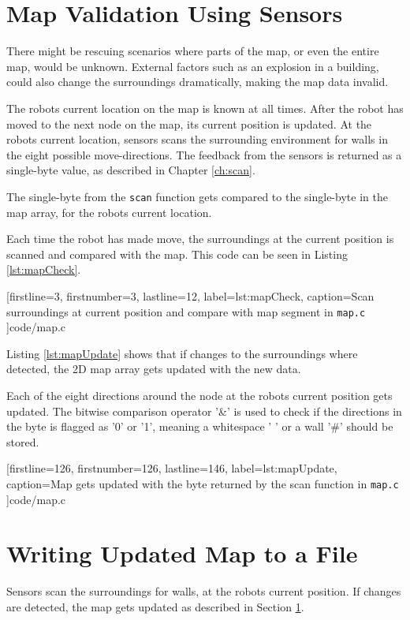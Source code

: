 \section{Map Validation Using Sensors}
\label{sec:map_check} %
There might be rescuing scenarios where parts of the map, or even the entire map, would be unknown.
External factors such as an explosion in a building, could also change the surroundings dramatically, making the map data invalid.
 
The robots current location on the map is known at all times. 
After the robot has moved to the next node on the map, its current position is updated.
At the robots current location, sensors scans the surrounding environment for walls in the eight possible move-directions.
The feedback from the sensors is returned as a single-byte value, as described in Chapter \ref{ch:scan}.

The single-byte from the {\tt scan} function gets compared to the single-byte in the map array, for the robots current location.


Each time the robot has made move, the surroundings at the current position is scanned and compared with the map.
This code can be seen in Listing \ref{lst:mapCheck}.
 

[firstline=3,			%
firstnumber=3,		%
lastline=12,			%
label=lst:mapCheck,	%
caption={Scan surroundings at current position and compare with map segment in {\tt map.c}}
]{code/map.c}

Listing \ref{lst:mapUpdate} shows that if changes to the surroundings where
detected, the 2D map array gets updated with the new data. 

Each of the eight directions around the node at the robots current position gets updated.
The bitwise comparison operator '\&' is used to check if the directions in the byte is flagged as '0' or '1',
meaning a whitespace ' ' or a wall '\#' should be stored.


[firstline=126,			%
firstnumber=126,		%
lastline=146,			%
label=lst:mapUpdate,	%
caption={Map gets updated with the byte returned by the scan function in {\tt map.c}}
]{code/map.c}

\newpage
\section{Writing Updated Map to a File}
\label{sec:map_save} %
Sensors scan the surroundings for walls, at the robots current position.
If changes are detected, the map gets updated as described in Section \ref{sec:map_check}.

